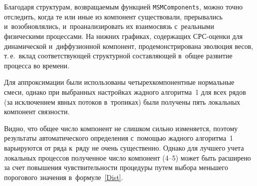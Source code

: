 \begin{multicols}{2}

\begin{figure*} %
\vspace*{1pt}
 \begin{center}
 \mbox{%
 \epsfxsize=156mm 
 }
 \end{center}
   \vspace*{-9pt}
\end{figure*}


\begin{figure*} %
\vspace*{1pt}
 \begin{center}
 \mbox{%
 \epsfxsize=156mm 
 }
 \end{center}
   \vspace*{-9pt}
\end{figure*}



Благодаря структурам, возвращаемым функцией \verb"MSMComponents",
 можно точно отследить, когда те или иные из компонент существовали, 
 прерывались и~возобновлялись, и~проанализировать их взаимосвязь с~реальными
  физическими процессами. На нижних графиках, содержащих СРС-оцен\-ки для 
  динамической и~диффузионной компонент, продемонстрирована эволюция весов, 
  т.\,е.\ вклад соответствующей структурной со\-став\-ля\-ющей в~общее 
  развитие процесса во времени.

Для аппроксимации были использованы четырехкомпонентные 
нормальные смеси, однако при выбранных настройках жад\-но\-го 
алгоритма~1 для всех рядов (за исключением
 явных потоков в~тропиках) были получены пять локальных
  компонент связ\-ности.


Видно, что общее чис\-ло компонент не слишком сильно изменяется, 
поэтому результаты автоматического определения с~по\-мощью 
жад\-но\-го алгоритма~1 варьируются от ряда к~ряду 
не очень существенно. Однако для лучшего учета локальных процессов 
полученное чис\-ло компонент (4--5) может быть расширено за счет 
повышения чув\-ст\-ви\-тель\-ности процедуры путем выбора меньшего 
порогового значения в~формуле~\eqref{Dist}.


\end{multicols}
